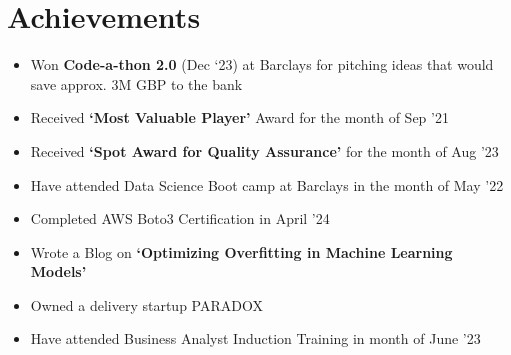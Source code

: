 \documentclass[letterpaper,11pt]{article}
\newcommand{\resumeItem}[1]{
  \item\small{
    {#1 \vspace{-2pt}}
  }
}
\newcommand{\resumeItemListStart}{\begin{itemize}}
\newcommand{\resumeItemListEnd}{\end{itemize}\vspace{-5pt}}
\begin{document}
 \section{Achievements}
  \resumeItemListStart
   
    \resumeItem{Won \textbf{Code-a-thon 2.0} (Dec ‘23) at Barclays for pitching ideas that would save approx. 3M GBP to the bank}
    \resumeItem{Received \textbf{‘Most Valuable Player’} Award for the month of Sep ’21}
    \resumeItem{Received \textbf{‘Spot Award for Quality Assurance’} for the month of Aug ’23}
    \resumeItem{Have attended Data Science Boot camp at Barclays in the month of May ’22}
    \resumeItem{Completed AWS Boto3 Certification in April ’24}
    \resumeItem{Wrote a Blog on \textbf{‘Optimizing Overfitting in Machine Learning Models’}}
    \resumeItem{Owned a delivery startup PARADOX}
    \resumeItem{Have attended Business Analyst Induction Training in month of June ’23}
  
  \resumeItemListEnd


\end{document}
